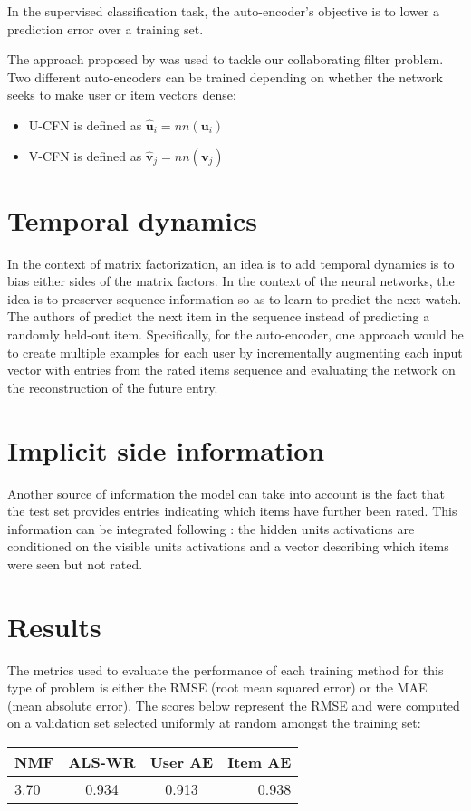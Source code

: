 \documentclass[10pt,twocolumn]{article}
\begin{document}
In the supervised classification task, the auto-encoder's objective is to lower a prediction error over a training set.

The approach proposed by \cite{strub2016hybrid} was used to tackle our collaborating filter problem. Two different auto-encoders can be trained depending on whether the network seeks to make user or item vectors dense:
\begin{itemize}
\item U-CFN is defined as $\hat{\textbf{u}}_i = nn(\textbf{u}_i)$
\item V-CFN is defined as $\hat{\textbf{v}}_j = nn(\textbf{v}_j)$ 
\end{itemize}

\section{Temporal dynamics}
In the context of matrix factorization, an idea is to add temporal dynamics is to bias either sides of the matrix factors. In the context of the neural networks, the idea is to preserver sequence information so as to learn to predict the next watch. The authors of \cite{youtube2016} predict the next item in the sequence instead of predicting a randomly held-out item. Specifically, for the auto-encoder, one approach would be to create multiple examples for each user by incrementally augmenting each input vector with entries from the rated items sequence and evaluating the network on the reconstruction of the future entry.

\section{Implicit side information}
Another source of information the model can take into account is the fact that the test set provides entries indicating which items have further been rated. This information can be integrated following \cite{salakhutdinov2007restricted}: the hidden units activations are conditioned on the visible units activations and a vector describing which items were seen but not rated.

\section{Results}
The metrics used to evaluate the performance of each training method for this type of problem is either the RMSE (root mean squared error) or the MAE (mean absolute error). The scores below represent the RMSE and were computed on a validation set selected uniformly at random amongst the training set:
\begin{tabular}{|l|c|c|r|}
  \hline
  NMF & ALS-WR & User AE & Item AE \\
  \hline
  3.70 & 0.934 & 0.913 & 0.938 \\
  \hline
\end{tabular}
\end{document}
